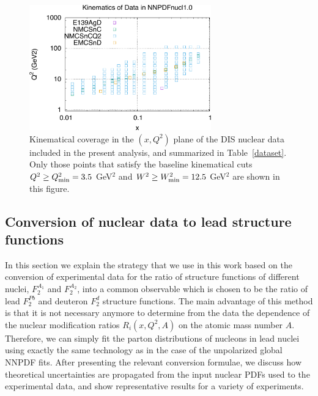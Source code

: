 \begin{figure}[t]
\begin{center}
  \includegraphics[width=0.70\textwidth]{plots/kinplot.pdf}
 \end{center}
\vspace{-0.3cm}
\caption{\small Kinematical coverage in the $(x,Q^2)$ plane
  of the DIS nuclear data included in the present analysis,
  and summarized in Table~\ref{dataset}.
  Only those points that satisfy the baseline kinematical
  cuts $Q^2 \ge Q^2_{\rm min}=3.5$ GeV$^2$ and $W^2 \ge W^2_{\rm min}=12.5$
GeV$^2$ are shown in this figure.
}
\label{figkinplot}
\end{figure}



\subsection{Conversion of nuclear data to lead structure functions}

In this section we explain the strategy that we use in this work based on the conversion of
experimental data for the ratio of structure functions of different nuclei, $F_2^{A_1}$ and $F_2^{A_2}$, into
a common observable which is chosen to be the ratio of lead $F_2^{Pb}$ and deuteron $F_2^d$ structure
functions.
%
The main advantage of this method is that it is not necessary anymore to determine from the data the
dependence of the nuclear modification ratios $R_{i}(x,Q^2,A)$ on the atomic mass number $A$.
%
Therefore, we can simply fit the parton distributions of nucleons in lead nuclei using exactly
the same technology as in the case of the unpolarized global NNPDF fits.
%
After presenting the  relevant conversion formulae,
we discuss how theoretical uncertainties are propagated from
the input nuclear PDFs used to the experimental data,
and show representative results for a variety of experiments.

